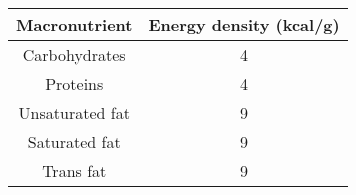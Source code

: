 \begin{tabular}[12pt]{ |c| c| }
    \hline
    {Macronutrient} & {Energy density (kcal/g)}\\ 
    \hline
    Carbohydrates & 4 \\
    \hline
    Proteins & 4 \\
    \hline
    Unsaturated fat & 9 \\
    \hline
    Saturated fat & 9 \\
    \hline
    Trans fat & 9 \\
    \hline
\end{tabular}
